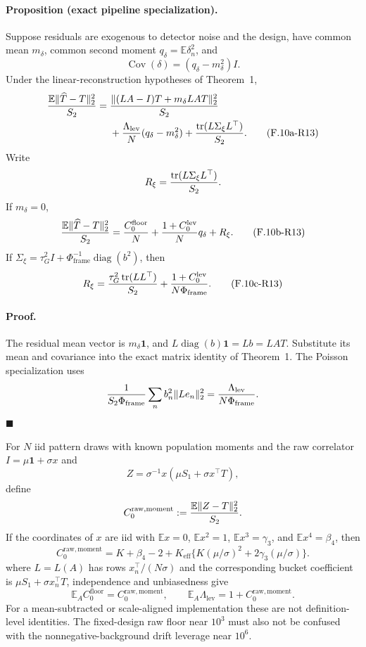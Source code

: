 \paragraph{Proposition (exact pipeline specialization).}
Suppose residuals are exogenous to detector noise and the design, have
common mean $m_\delta$, common second moment
$q_\delta=\mathbb E\delta_n^2$, and
\[
 \operatorname{Cov}(\delta)=(q_\delta-m_\delta^2)I.
\]
Under the linear-reconstruction hypotheses of Theorem~1,
\begin{align}
 {\mathbb E\|\widehat T-T\|_2^2\over S_2}
 ={}&{\|(LA-I)T+m_\delta LAT\|_2^2\over S_2}\notag\\
 &+{\Lambda_{\mathrm{lev}}\over N}
   (q_\delta-m_\delta^2)
 +{\operatorname{tr}(L\Sigma_\xi L^\top)\over S_2}.
 \tag{F.10a-R13}
\end{align}
Write
\[
 R_\xi={\operatorname{tr}(L\Sigma_\xi L^\top)\over S_2}.
\]
If $m_\delta=0$,
\begin{equation}
 {\mathbb E\|\widehat T-T\|_2^2\over S_2}
 ={C_0^{\mathrm{floor}}\over N}
 +{1+C_0^{\mathrm{lev}}\over N}q_\delta+R_\xi.
 \tag{F.10b-R13}
\end{equation}
If
$\Sigma_\xi=\tau_G^2I+\Phi_{\mathrm{frame}}^{-1}
\operatorname{diag}(b^2)$, then
\begin{equation}
 R_\xi={\tau_G^2\operatorname{tr}(LL^\top)\over S_2}
 +{1+C_0^{\mathrm{lev}}\over N\Phi_{\mathrm{frame}}}.
 \tag{F.10c-R13}
\end{equation}

\paragraph{Proof.}
The residual mean vector is $m_\delta\mathbf1$, and
$L\operatorname{diag}(b)\mathbf1=Lb=LAT$.  Substitute its mean and
covariance into the exact matrix identity of Theorem~1.  The Poisson
specialization uses
\[
 {1\over S_2\Phi_{\mathrm{frame}}}
 \sum_nb_n^2\|Le_n\|_2^2
 ={\Lambda_{\mathrm{lev}}\over N\Phi_{\mathrm{frame}}}.
\]
\hfill$\blacksquare$

For $N$ iid pattern draws with known population moments and the raw
correlator
$I=\mu\mathbf1+\sigma x$ and
\[
 Z=\sigma^{-1}x(\mu S_1+\sigma x^\top T),
\]
define
\[
 C_0^{\mathrm{raw,moment}}
 :={\mathbb E\|Z-T\|_2^2\over S_2}.
\]
If the coordinates of $x$ are iid with
$\mathbb Ex=0$, $\mathbb Ex^2=1$,
$\mathbb Ex^3=\gamma_3$, and $\mathbb Ex^4=\beta_4$, then
\begin{equation}
 C_0^{\mathrm{raw,moment}}
 =K+\beta_4-2
 +K_{\mathrm{eff}}\{K(\mu/\sigma)^2
                    +2\gamma_3(\mu/\sigma)\}. \tag{F.10-R13}
\end{equation}
where $L=L(A)$ has rows $x_n^\top/(N\sigma)$ and the corresponding
bucket coefficient is $\mu S_1+\sigma x_n^\top T$, independence and
unbiasedness give
\[
 \mathbb E_A C_0^{\mathrm{floor}}
 =C_0^{\mathrm{raw,moment}},
 \qquad
 \mathbb E_A\Lambda_{\mathrm{lev}}
 =1+C_0^{\mathrm{raw,moment}}.
\]
For a mean-subtracted or scale-aligned implementation these are not
definition-level identities.  The fixed-design raw floor near $10^3$
must also not be confused with the nonnegative-background drift
leverage near $10^6$.

